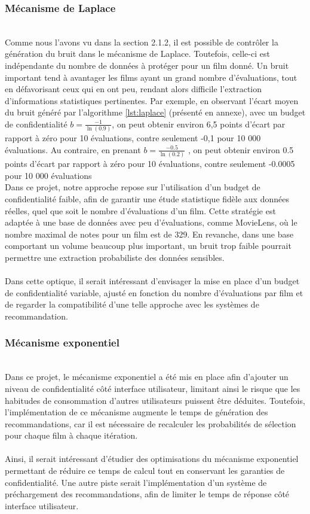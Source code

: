 \documentclass{article}
\begin{document}
\subsubsection{Mécanisme de Laplace}
$ $\\
Comme nous l’avons vu dans la section 2.1.2, il est possible de contrôler la génération du bruit dans le mécanisme de Laplace.
Toutefois, celle-ci est indépendante du nombre de données à protéger pour un film donné. Un bruit important tend à avantager les
films ayant un grand nombre d’évaluations, tout en défavorisant ceux qui en ont peu, rendant alors difficile l’extraction d’informations
statistiques pertinentes. Par exemple, en observant l’écart moyen du bruit généré par l’algorithme \ref{lst:laplace} (présenté en annexe),
avec un budget de confidentialité $b= \frac{-1}{\ln(0.9)}$, on peut obtenir environ 6,5 points d’écart par rapport à zéro pour 10
évaluations, contre seulement -0,1 pour 10 000 évaluations. Au contraire, en prenant $b= \frac{-0.5}{\ln(0.2)}$ , on peut obtenir environ
0.5 points d’écart par rapport à zéro pour 10 évaluations, contre seulement -0.0005 pour 10 000 évaluations\\
Dans ce projet, notre approche repose sur l’utilisation d’un budget de confidentialité faible, afin de garantir une étude statistique
fidèle aux données réelles, quel que soit le nombre d’évaluations d’un film. Cette stratégie est adaptée à une base de données avec
peu d’évaluations, comme MovieLens, où le nombre maximal de notes pour un film est de 329. En revanche, dans une base comportant un volume
beaucoup plus important, un bruit trop faible pourrait permettre une extraction probabiliste des données sensibles.\\
\\
Dans cette optique, il serait intéressant d’envisager la mise en place d’un budget de confidentialité variable, ajusté en fonction du nombre d’évaluations
par film et de regarder la compatibilité d'une telle approche avec les systèmes de recommandation.
\subsubsection{Mécanisme exponentiel}
$ $\\
Dans ce projet, le mécanisme exponentiel a été mis en place afin d’ajouter un niveau de confidentialité côté interface utilisateur, limitant
ainsi le risque que les habitudes de consommation d'autres utilisateurs puissent être déduites. Toutefois, l’implémentation de ce mécanisme
augmente le temps de génération des recommandations, car il est nécessaire de recalculer les probabilités de sélection pour chaque film à chaque itération.\\
\\
Ainsi, il serait intéressant d’étudier des optimisations du mécanisme exponentiel permettant de réduire ce temps de calcul tout en conservant les garanties
de confidentialité. Une autre piste serait l’implémentation d’un système de préchargement des recommandations, afin de limiter le temps de réponse côté interface utilisateur.
\end{document}
